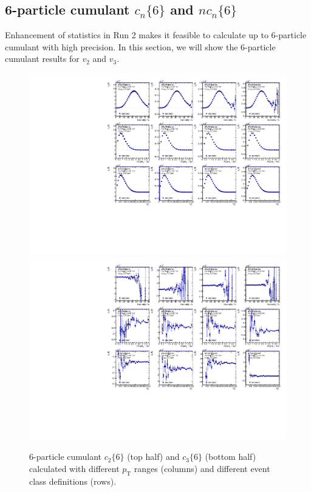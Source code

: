 \subsection{6-particle cumulant $c_n\{6\}$ and $nc_n\{6\}$}
Enhancement of statistics in Run 2 makes it feasible to calculate up to 6-particle cumulant with high precision. In this section, we will show the 6-particle cumulant results for $v_2$ and $v_3$.
\begin{figure}[H]
\centering
\includegraphics[width=.95\linewidth]{figs/sec_result/forQM/phy_c6_Har2.pdf}
\includegraphics[width=.95\linewidth]{figs/sec_result/forQM/phy_c6_Har3.pdf}
\caption{6-particle cumulant $c_2\{6\}$ (top half) and $c_3\{6\}$ (bottom half) calculated with different $p_\text{T}$ ranges (columns) and different event class definitions (rows).}
\label{fig:result_phy_c6_Har23}
\end{figure}
